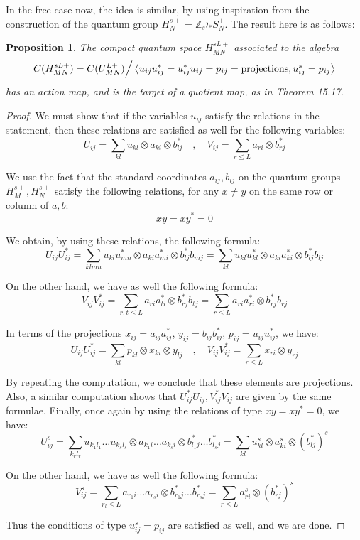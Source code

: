 \documentclass[12pt]{amsbook}
\newtheorem{proposition}[theorem]{Proposition}
\begin{document}
In the free case now, the idea is similar, by using inspiration from the construction of the quantum group $H_N^{s+}=\mathbb Z_s\wr_*S_N^+$. The result here is as follows:


\begin{proposition}
The compact quantum space $H_{MN}^{sL+}$ associated to the algebra
$$C(H_{MN}^{sL+})=C(U_{MN}^{L+})\Big/\left<u_{ij}u_{ij}^*=u_{ij}^*u_{ij}=p_{ij}={\rm projections},u_{ij}^s=p_{ij}\right>$$
has an action map, and is the target of a quotient map, as in Theorem 15.17.
\end{proposition}

\begin{proof}
We must show that if the variables $u_{ij}$ satisfy the relations in the statement, then these relations are satisfied as well for the following variables: 
$$U_{ij}=\sum_{kl}u_{kl}\otimes a_{ki}\otimes b_{lj}^*\quad,\quad 
V_{ij}=\sum_{r\leq L}a_{ri}\otimes b_{rj}^*$$

We use the fact that the standard coordinates $a_{ij},b_{ij}$ on the quantum groups $H_M^{s+},H_N^{s+}$ satisfy the following relations, for any $x\neq y$ on the same row or column of $a,b$:
$$xy=xy^*=0$$
 
We obtain, by using these relations, the following formula:
$$U_{ij}U_{ij}^*
=\sum_{klmn}u_{kl}u_{mn}^*\otimes a_{ki}a_{mi}^*\otimes b_{lj}^*b_{mj}
=\sum_{kl}u_{kl}u_{kl}^*\otimes a_{ki}a_{ki}^*\otimes b_{lj}^*b_{lj}$$

On the other hand, we have as well the following formula:
$$V_{ij}V_{ij}^*
=\sum_{r,t\leq L}a_{ri}a_{ti}^*\otimes b_{rj}^*b_{tj}
=\sum_{r\leq L}a_{ri}a_{ri}^*\otimes b_{rj}^*b_{rj}$$

In terms of the projections $x_{ij}=a_{ij}a_{ij}^*$, $y_{ij}=b_{ij}b_{ij}^*$, $p_{ij}=u_{ij}u_{ij}^*$, we have:
$$U_{ij}U_{ij}^*=\sum_{kl}p_{kl}\otimes x_{ki}\otimes y_{lj}\quad,\quad 
V_{ij}V_{ij}^*=\sum_{r\leq L}x_{ri}\otimes y_{rj}$$

By repeating the computation, we conclude that these elements are projections. Also, a similar computation shows that $U_{ij}^*U_{ij},V_{ij}^*V_{ij}$ are given by the same formulae. Finally, once again by using the relations of type $xy=xy^*=0$, we have:
$$U_{ij}^s
=\sum_{k_rl_r}u_{k_1l_1}\ldots u_{k_sl_s}\otimes a_{k_1i}\ldots a_{k_si}\otimes b_{l_1j}^*\ldots b_{l_sj}^*
=\sum_{kl}u_{kl}^s\otimes a_{ki}^s\otimes(b_{lj}^*)^s$$

On the other hand, we have as well the following formula:
$$V_{ij}^s
=\sum_{r_l\leq L}a_{r_1i}\ldots a_{r_si}\otimes b_{r_1j}^*\ldots b_{r_sj}^*
=\sum_{r\leq L}a_{ri}^s\otimes(b_{rj}^*)^s$$

Thus the conditions of type $u_{ij}^s=p_{ij}$ are satisfied as well, and we are done.
\end{proof}
\end{document}
